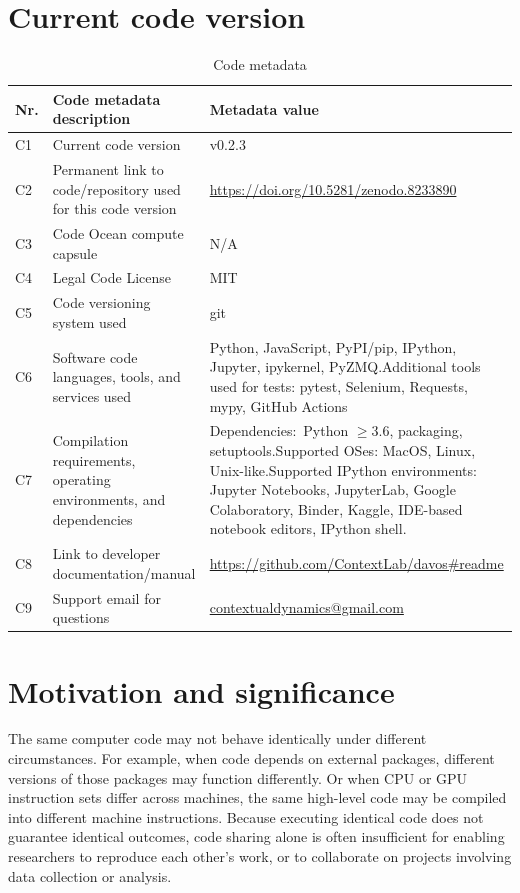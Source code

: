 \documentclass[preprint,12pt,a4paper]{elsarticle}
\begin{document}
\section*{Current code version}

\begin{table}[H]
  \footnotesize
\begin{tabular}{|l|p{6cm}|p{8cm}|}
\hline
\textbf{Nr.} & \textbf{Code metadata description} & \textbf{Metadata value} \\
\hline
C1 & Current code version &  v0.2.3 \\
\hline
C2 & Permanent link to code/repository used for this code version & \url{https://doi.org/10.5281/zenodo.8233890} \\
\hline
C3 & Code Ocean compute capsule & N/A\\
\hline
C4 & Legal Code License & MIT \\
\hline
C5 & Code versioning system used & git \\
\hline
C6 & Software code languages, tools, and services used & Python, JavaScript, PyPI/pip, IPython, Jupyter, ipykernel, PyZMQ.\newline Additional tools used for tests: pytest, Selenium, Requests, mypy, GitHub Actions \\
\hline
C7 & Compilation requirements, operating environments, and
     dependencies & Dependencies:~Python $\geq 3.6$, packaging, setuptools.\newline Supported OSes: MacOS, Linux, Unix-like.\newline Supported IPython environments: Jupyter Notebooks, JupyterLab, Google Colaboratory, Binder, Kaggle, IDE-based notebook editors, IPython shell. \\
\hline
C8 & Link to developer documentation/manual & \url{https://github.com/ContextLab/davos\#readme} \\
\hline
C9 & Support email for questions & \href{mailto:contextualdynamics@gmail.com}{contextualdynamics@gmail.com} \\
\hline
\end{tabular}
\caption{Code metadata}
\label{}
\end{table}

\linenumbers


\section{Motivation and significance}

The same computer code may not behave identically under different
circumstances. For example, when code depends on external packages,
different versions of those packages may function differently. Or
when CPU or GPU instruction sets differ across machines, the same
high-level code may be compiled into different machine instructions.
Because executing identical code does not guarantee identical
outcomes, code sharing alone is often insufficient for enabling
researchers to reproduce each other's work, or to collaborate on
projects involving data collection or analysis.
\end{document}
